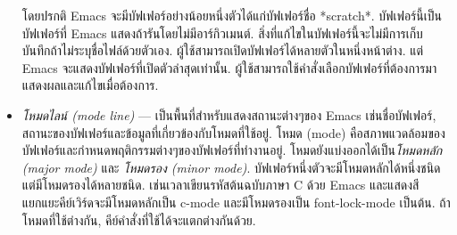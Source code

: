 \begin{thwbr}
\begin{itemize}
โดยปรกติ Emacs จะมีบัฟเฟอร์อย่างน้อยหนึ่งตัวได้แก่บัฟเฟอร์ชื่อ *scratch*. บัฟเฟอร์นี้เป็นบัฟเฟอร์ที่ Emacs แสดงถ้ารันโดยไม่มีอาร์กิวเมนต์. สิ่งที่แก้ไขในบัฟเฟอร์นี้จะไม่มีการเก็บบันทึกถ้าไม่ระบุชื่อไฟล์ด้วยตัวเอง. ผู้ใช้สามารถเปิดบัฟเฟอร์ได้หลายตัวในหนึ่งหน้าต่าง. แต่ Emacs จะแสดงบัฟเฟอร์ที่เปิดตัวล่าสุดเท่านั้น. ผู้ใช้สามารถใช้คำสั่งเลือกบัฟเฟอร์ที่ต้องการมาแสดงผลและแก้ไขเมื่อต้องการ.
\item \emph{โหมดไลน์ (mode line)} --- เป็นพื้นที่สำหรับแสดงสถานะต่างๆของ Emacs เช่นชื่อบัฟเฟอร์, สถานะของบัฟเฟอร์และข้อมูลที่เกี่ยวข้องกับโหมดที่ใช้อยู่. โหมด (mode) คือสภาพแวดล้อมของบัฟเฟอร์และกำหนดพฤติกรรมต่างๆของบัฟเฟอร์ที่ทำงานอยู่. โหมดยังแบ่งออกได้เป็น\emph{โหมดหลัก (major mode)} และ \emph{โหมดรอง (minor mode)}. บัฟเฟอร์หนึ่งตัวจะมีโหมดหลักได้หนึ่งชนิดแต่มีโหมดรองได้หลายชนิด. เช่นเวลาเขียนรหัสต้นฉบับภาษา C ด้วย Emacs และแสดงสีแยกแยะคีย์เวิร์ดจะมีโหมดหลักเป็น c-mode และมีโหมดรองเป็น font-lock-mode เป็นต้น. ถ้าโหมดที่ใช้ต่างกัน, คีย์คำสั่งที่ใช้ได้จะแตกต่างกันด้วย. 

\begin{figure}[!hbt]
\end{figure}


\end{itemize}
\end{thwbr}
